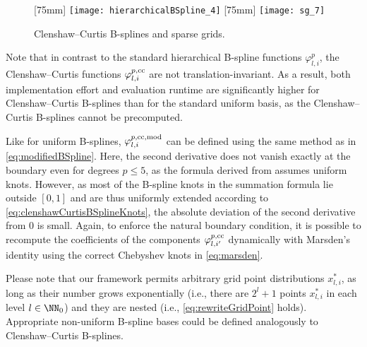 \begin{figure}
  [75mm]{%
    \texttt{[image: hierarchicalBSpline\_4]}%
  }%
  \hfill%
  [75mm]{%
    \texttt{[image: sg\_7]}%
  }%
  \caption{%
    Clenshaw--Curtis B-splines and sparse grids.%
  }
  \label{fig:clenshawCurtis}
\end{figure}

Note that in contrast to the standard hierarchical B-spline functions
$\varphi_{l,i}^p$, the Clenshaw--Curtis functions
$\varphi_{l,i}^{p,\mathrm{cc}}$ are not translation-invariant.
As a result, both implementation effort and evaluation runtime
are significantly higher for Clenshaw--Curtis B-splines than
for the standard uniform basis,
as the Clenshaw--Curtis B-splines cannot be precomputed.

Like for uniform B-splines,
$\varphi_{l,i}^{p,\mathrm{cc},\mathrm{mod}}$ can be defined using the
same method as in \eqref{eq:modifiedBSpline}.
Here, the second derivative does not vanish exactly at the boundary
even for degrees $p \le 5$,
as the formula derived from  assumes uniform knots.
However, as most of the B-spline knots in the summation formula
lie outside $[0, 1]$ and are thus uniformly extended according
to \eqref{eq:clenshawCurtisBSplineKnots},
the absolute deviation of the second derivative from $0$ is small.
Again, to enforce the natural boundary condition,
it is possible to recompute the coefficients
of the components $\varphi_{l,i'}^{p,\mathrm{cc}}$
dynamically with Marsden's identity using the correct Chebyshev knots
in \eqref{eq:marsden}.

Please note that our framework permits arbitrary grid point distributions
$x_{l,i}^\ast$,
as long as their number grows exponentially
(i.e., there are $2^l + 1$ points $x_{l,i}^\ast$ in each level $l \in \NN_0$)
and they are nested
(i.e., \eqref{eq:rewriteGridPoint} holds).
Appropriate non-uniform B-spline bases could be defined analogously
to Clenshaw--Curtis B-splines.
